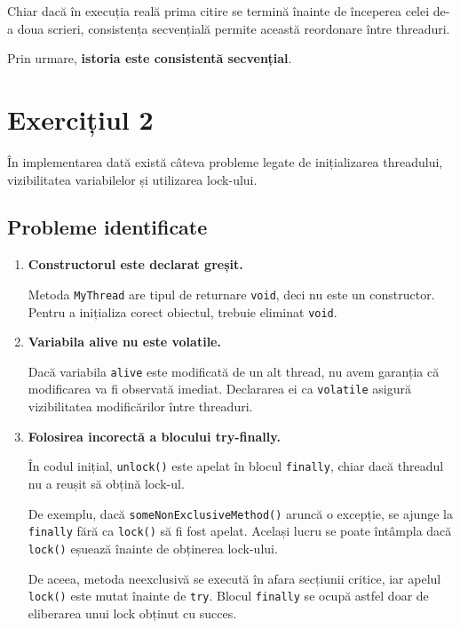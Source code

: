 \documentclass[12pt,a4paper]{article}
\begin{document}
Chiar dacă în execuția reală prima citire
se termină înainte de începerea celei
de-a doua scrieri, consistența secvențială
permite această reordonare între threaduri.

Prin urmare, \textbf{istoria este
consistentă secvențial}.

\newpage
\section*{Exercițiul 2}

În implementarea dată există câteva probleme
legate de inițializarea threadului, vizibilitatea
variabilelor și utilizarea lock-ului.

\subsection*{Probleme identificate}

\begin{enumerate}
    \item \textbf{Constructorul este declarat greșit.}

    Metoda \texttt{MyThread} are tipul de
    returnare \texttt{void}, deci nu este un
    constructor. Pentru a inițializa corect
    obiectul, trebuie eliminat \texttt{void}.

    \item \textbf{Variabila alive nu este volatile.}

    Dacă variabila \texttt{alive} este modificată
    de un alt thread, nu avem garanția că
    modificarea va fi observată imediat.
    Declararea ei ca \texttt{volatile} asigură
    vizibilitatea modificărilor între threaduri.

    \item \textbf{Folosirea incorectă a blocului try-finally.}

    În codul inițial, \texttt{unlock()} este apelat
    în blocul \texttt{finally}, chiar dacă threadul
    nu a reușit să obțină lock-ul.

    De exemplu, dacă \texttt{someNonExclusiveMethod()}
    aruncă o excepție, se ajunge la \texttt{finally}
    fără ca \texttt{lock()} să fi fost apelat.
    Același lucru se poate întâmpla dacă
    \texttt{lock()} eșuează înainte de obținerea
    lock-ului.

    De aceea, metoda neexclusivă se execută
    în afara secțiunii critice, iar apelul
    \texttt{lock()} este mutat înainte de
    \texttt{try}. Blocul \texttt{finally} se
    ocupă astfel doar de eliberarea unui lock
    obținut cu succes.
\end{enumerate}
\end{document}
